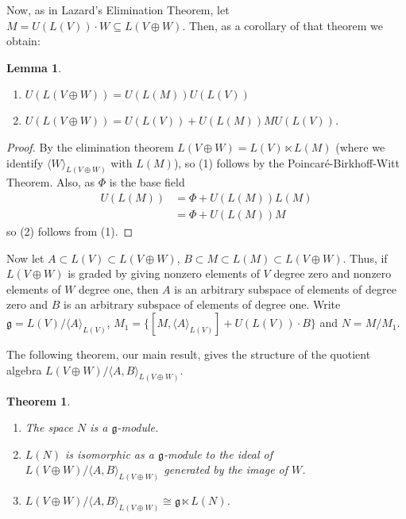 \documentclass[11pt]{amsart}
\newtheorem{theorem}{Theorem}%
\newtheorem{lemma}{Lemma}
\theoremstyle{definition}
\newcommand\la{\langle}
\newcommand\ra{\rangle}
\renewcommand{\frak}{\mathfrak}
\begin{document}
Now, as in Lazard's Elimination Theorem, let $M = U(L(V))\cdot W \subseteq L(V \oplus W).$  
Then, as a corollary of that theorem we obtain:

\begin{lemma} \hfill
\begin{enumerate}
\item $U(L(V \oplus W)) = U(L(M))U(L(V))$
\item $U(L(V\oplus W)) = U(L(V)) + U(L(M)) M U(L(V))$.
\end{enumerate}
\end{lemma}

\begin{proof}
By the elimination theorem
$L(V \oplus W) = L(V) \ltimes L(M)$ 
(where we identify $\la W \ra_{L(V \oplus W)}$ 
with $L(M)$), so (1) follows by the
Poincar\'{e}-Birkhoff-Witt Theorem. Also, as $\Phi $ is the base field
\begin{align*}
U(L(M))&= \Phi + U(L(M))L(M)\\
&=\Phi + U(L(M))M
\end{align*} 
so (2) follows {}from (1).
\end{proof}

Now let $A \subset L(V) \subset L(V\oplus W)$, $B \subset M \subset L(M)
\subset L(V \oplus W)$. Thus, if $L(V \oplus W)$ is
graded by giving nonzero elements of $V$ degree zero and nonzero
elements of $W$ degree
one, then $A$ is an arbitrary subspace of elements of degree 
zero and $B$ is an arbitrary subspace of elements of degree one.
Write $\frak g = L(V)/ \la A \ra_{L(V)}$, 
$M_1 = \{ [M, \la A\ra_{L(V)}] + U(L(V))\cdot B \}$ and $N =
M/M_1$.

The following theorem, our main result, gives the structure of the quotient algebra 
$L(V \oplus W)/ \la A, B\ra_{L(V \oplus W)}$.

\begin{theorem} \hfill
\begin{enumerate}
\item The space $N$ is a $\frak g$-module.
\item $L(N)$ is isomorphic as a 
$\frak g$-module to the ideal of $L(V \oplus W)/ \la
A, B\ra_{L(V \oplus W)}$ generated by the image of $W$.
\item $L(V \oplus W)/ \la A, B\ra_{L(V \oplus W)} \cong \frak g
\ltimes L(N)$.
\end{enumerate}
\end{theorem}
\end{document}
